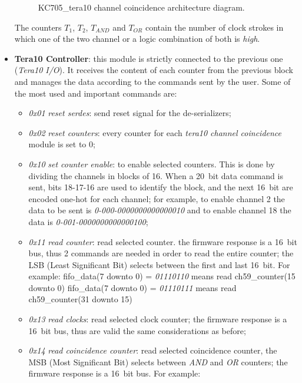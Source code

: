 \begin{itemize}
\begin{figure}[H]
		\caption{KC705\_tera10 channel coincidence architecture diagram.}
		\label{fig:coincidence}
	\end{figure}
	\noindent The counters $T_{1}$, $T_{2}$, $T_{AND}$ and $T_{OR}$ contain the number of clock strokes in which one of the two channel or a logic combination of both is \textit{high}.
	\item \textbf{Tera10 Controller}: this module is strictly connected to the previous one (\textit{Tera10 I/O}). It receives the content of each counter from the previous block and manages the data according to the commands sent by the user. Some of the most used and important commands are:
	\begin{itemize}
		\item \textit{0x01} \textit{reset serdes}: send reset signal for the de-serializers;
		\item \textit{0x02} \textit{reset counters}: every counter for each \textit{tera10 channel coincidence} module is set to 0;
		\item \textit{0x10} \textit{set counter enable}: to enable selected counters. This is done by dividing the channels in blocks of 16. When a 20~bit data command is sent, bits 18-17-16 are used to identify the block, and the next 16~bit are encoded one-hot for each channel; for example, to enable channel 2 the data to be sent is \textit{0-000-0000000000000010} and to enable channel 18 the data is \textit{0-001-0000000000000100};  
		\item \textit{0x11} \textit{read counter}: read selected counter. the firmware response is a 16~bit bus, thus 2 commands are needed in order to read the entire counter; the LSB (Least Significant Bit) selects between the first and last 16~bit. For example:
		\newline
		fifo\_data(7 downto 0) = \textit{01110110} means read ch59\_counter(15 downto 0)
		\newline
		fifo\_data(7 downto 0) = \textit{01110111} means read ch59\_counter(31 downto 15)
		\item \textit{0x13} \textit{read clocks}: read selected clock counter; the firmware response is a 16~bit bus, thus are valid the same considerations as before;
		\item \textit{0x14} \textit{read coincidence counter}: read selected coincidence counter, the MSB (Most Significant Bit) selects between \textit{AND} and \textit{OR} counters; the firmware response is a 16~bit bus. For example:

\end{itemize}
\end{itemize}
